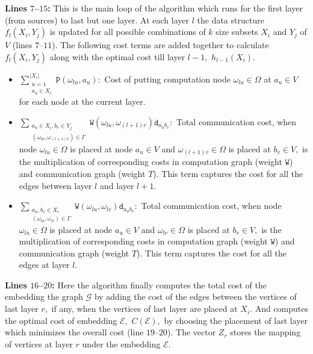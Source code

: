 \documentclass[journal]{IEEEtran}
\newcommand{\netnodes}{V}
\newcommand{\compgraph}{\mathcal{G}}
\newcommand{\compnodes}{\Omega}
\newcommand{\compedges}{\Gamma}
\newcommand{\distance}{\mathtt{d}} \newcommand{\edgewt}{\mathtt{W}} \newcommand{\processingwt}{\mathtt{P}}
\newcommand{\embedding}{\mathcal{E}}
\begin{document}
\textbf{Lines $7$--$15$:} This is the main loop of the algorithm which
  runs for the first layer (from sources) to last but one layer. At
  each layer $l$ the data structure $f_l(X_i,Y_j)$ is updated for all
  possible combinations of $k$ size subsets $X_i$ and $Y_j$ of
  $\netnodes$ (lines $7$--$11$). The following cost terms are added
  together to calculate $f_l(X_i,Y_j)$ along with the optimal cost
  till layer $l-1,$ $h_{l-1}(X_i).$
\begin{itemize}
  \item $\sum\limits_{\substack{u=1 \\ a_u \in X_i}}^{|X_i|}
    \processingwt(\omega_{lu},a_u):$ Cost of putting computation node
    $\omega_{lu} \in \compnodes$ at $a_u \in \netnodes$ for each node
    at the current layer.
  \item $\sum\limits_{\substack{a_u \in X_i, b_v \in Y_j \\
        (\omega_{lu},\omega_{(l+1)v}) \in \compedges}}
    \edgewt(\omega_{lu},\omega_{(l+1)v}) \distance_{a_ub_v}:$ Total
    communication cost, when node $\omega_{lu} \in \compnodes$ is
    placed at node $a_u \in \netnodes$ and $\omega_{(l+1)v} \in
    \compnodes$ is placed at $b_v \in \netnodes,$ is the
    multiplication of corresponding costs in computation graph (weight
    $\edgewt$) and communication graph (weight $T$). This term
    captures the cost for all the edges between layer $l$ and layer
    $l+1.$
  \item $\sum\limits_{\substack{ a_u,b_v \in X_i \\
        (\omega_{lu},\omega_{lv}) \in \compedges}}
    \edgewt(\omega_{lu},\omega_{lv}) \distance_{a_ub_v}:$ Total
    communication cost, when node $\omega_{lu} \in \compnodes$ is
    placed at node $a_u \in \netnodes$ and $\omega_{lv} \in
    \compnodes$ is placed at $b_v \in \netnodes,$ is the
    multiplication of corresponding costs in computation graph (weight
    $\edgewt$) and communication graph (weight $T$). This term
    captures the cost for all the edges at layer $l.$
  \end{itemize}


\textbf{Lines $16$--$20$:} Here the algorithm finally computes the total
  cost of the embedding the graph $\compgraph$ by adding the cost of
  the edges between the vertices of last layer $r,$ if any, when the
  vertices of last layer are placed at $X_i.$ And computes the optimal
  cost of embedding $\embedding,$ $C(\embedding),$ by choosing the
  placement of last layer which minimizes the overall cost (line
  $19$--$20$). The vector $Z_r$ stores the mapping of vertices at
  layer $r$ under the embedding $\embedding.$
  
\end{document}
